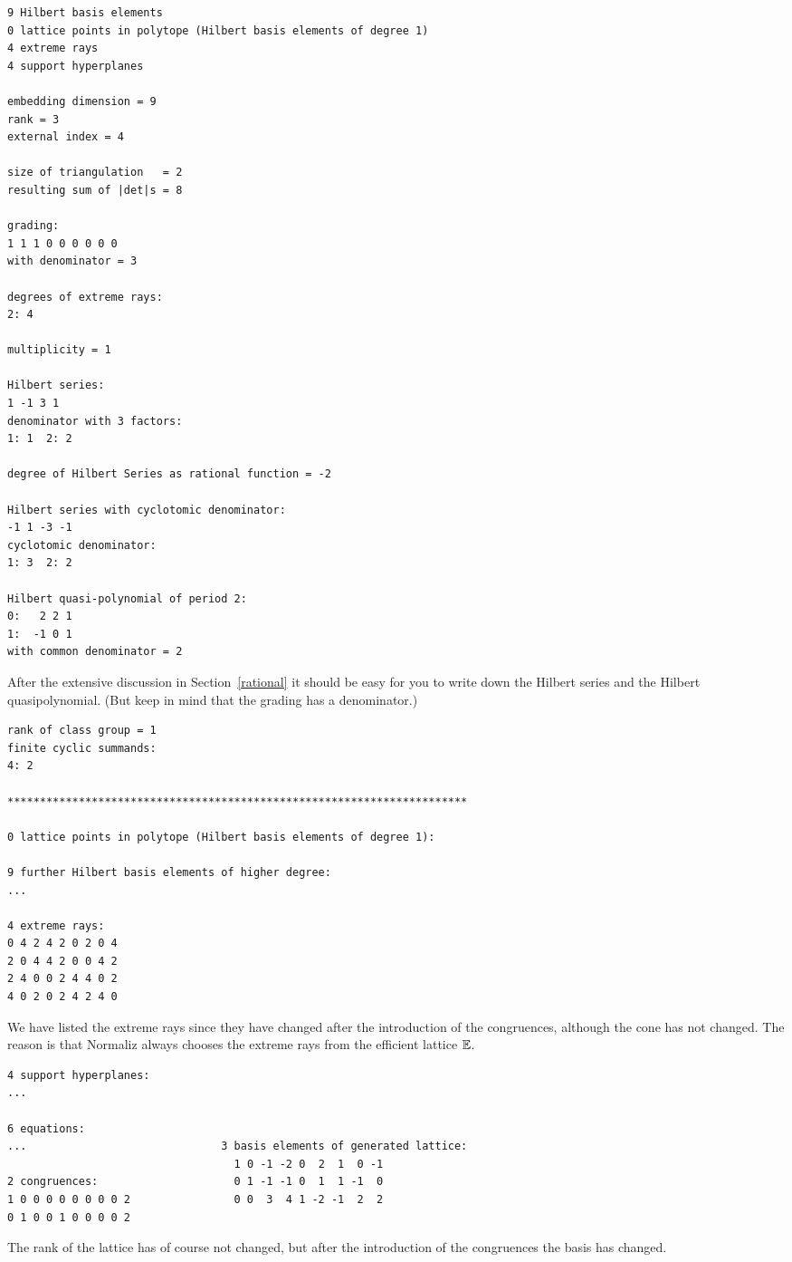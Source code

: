 \begin{Verbatim}
9 Hilbert basis elements
0 lattice points in polytope (Hilbert basis elements of degree 1)
4 extreme rays
4 support hyperplanes

embedding dimension = 9
rank = 3
external index = 4

size of triangulation   = 2
resulting sum of |det|s = 8

grading:
1 1 1 0 0 0 0 0 0 
with denominator = 3

degrees of extreme rays:
2: 4  

multiplicity = 1

Hilbert series:
1 -1 3 1 
denominator with 3 factors:
1: 1  2: 2  

degree of Hilbert Series as rational function = -2

Hilbert series with cyclotomic denominator:
-1 1 -3 -1 
cyclotomic denominator:
1: 3  2: 2  

Hilbert quasi-polynomial of period 2:
0:   2 2 1
1:  -1 0 1
with common denominator = 2
\end{Verbatim}
After the extensive discussion in Section~\ref{rational} it should be easy for you to write down the Hilbert series and the Hilbert quasipolynomial. (But keep in mind that the grading has a denominator.)
\begin{Verbatim}
rank of class group = 1
finite cyclic summands:
4: 2  

***********************************************************************

0 lattice points in polytope (Hilbert basis elements of degree 1):

9 further Hilbert basis elements of higher degree:
...

4 extreme rays:
0 4 2 4 2 0 2 0 4
2 0 4 4 2 0 0 4 2
2 4 0 0 2 4 4 0 2
4 0 2 0 2 4 2 4 0
\end{Verbatim}
We have listed the extreme rays since they have changed after the introduction of the congruences, although the cone has not changed. The reason is that Normaliz always chooses the extreme rays from the efficient lattice ${\mathbb E}$.
\begin{Verbatim}
4 support hyperplanes:
...

6 equations:
...                              3 basis elements of generated lattice:
                                   1 0 -1 -2 0  2  1  0 -1
2 congruences:                     0 1 -1 -1 0  1  1 -1  0
1 0 0 0 0 0 0 0 0 2                0 0  3  4 1 -2 -1  2  2
0 1 0 0 1 0 0 0 0 2
\end{Verbatim}
The rank of the lattice has of course not changed, but after the introduction of the congruences the basis has changed.

